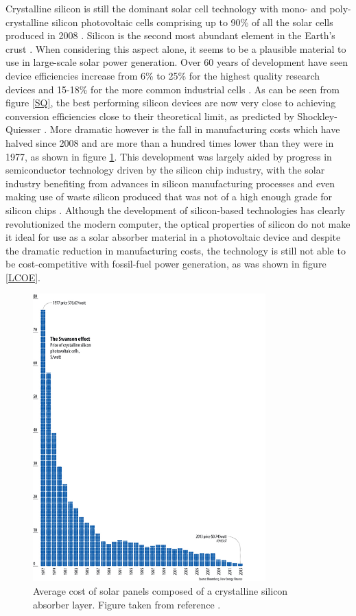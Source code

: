 \documentclass[11pt, twoside]{report}
\begin{document}
Crystalline silicon is still the dominant solar cell technology with mono- and poly-crystalline silicon photovoltaic cells comprising up to 90\% of all the solar cells produced in 2008  \cite{Si_rev}. Silicon is the second most abundant element in the Earth's crust \cite{Si_abundance}. When considering this aspect alone, it seems to be a plausible material to use in large-scale solar power generation. Over 60 years of development have seen device efficiencies increase from 6\% to 25\% for the highest quality research devices and 15-18\% for the more common industrial cells \cite{Si_rev}. As can be seen from figure \ref{SQ}, the best performing silicon devices are now very close to achieving conversion efficiencies close to their theoretical limit, as predicted by Shockley-Quiesser \cite{SQ_1961}. More dramatic however is the fall in manufacturing costs which have halved since 2008 and are more than a hundred times lower than they were in 1977, as shown in figure \ref{Si_cost}. This development was largely aided by progress in semiconductor technology driven by the silicon chip industry, with the solar industry benefiting from advances in silicon manufacturing processes and even making use of waste silicon produced that was not of a high enough grade for silicon chips \cite{PV_history1}. Although the development of silicon-based technologies has clearly revolutionized the modern computer, the optical properties of silicon do not make it ideal for use as a solar absorber material in a photovoltaic device and despite the dramatic reduction in manufacturing costs, the technology is still not able to be cost-competitive with fossil-fuel power generation, as was shown in figure \ref{LCOE}.

\begin{figure}[h!]
  \centering
    \includegraphics[width=0.8\textwidth]{figures/Si_cost.jpg}
    \caption{Average cost of solar panels composed of a crystalline silicon absorber layer. Figure taken from reference .}
  \label{Si_cost}
\end{figure}
\end{document}
